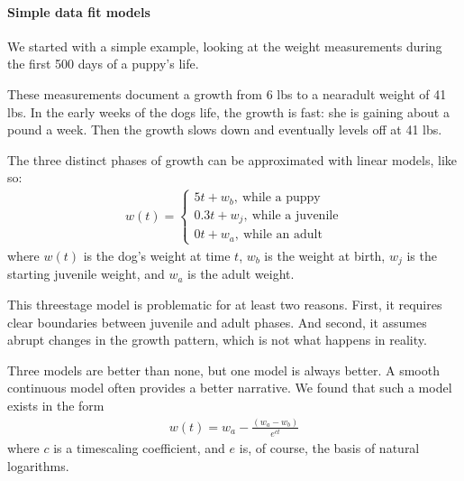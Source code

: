 \documentclass[letterpaper,10pt,english]{sphinxmanual}
\let\sphinxpxdimen\pdfpxdimen\else\newdimen\sphinxpxdimen
\begin{document}
\paragraph{Simple data fit models}
\label{\detokenize{COMP180/2020Spring/week2:simple-data-fit-models}}
\noindent{\hspace*{\fill}\sphinxincludegraphics[width=270.00000\sphinxpxdimen,height=180.00000\sphinxpxdimen]{{puppyGrowth}.png}}

We started with a simple example, looking at the weight measurements during the first 500 days of a puppy’s life.

These measurements document a growth from 6 lbs to a near\sphinxhyphen{}adult weight of 41 lbs. In the early weeks of the dogs life, the growth is fast: she is gaining about a pound a week. Then the growth slows down and eventually levels off at 41 lbs.

The three distinct phases of growth can be approximated with linear models, like so:
\begin{equation*}
\begin{split}w(t) = \left\{ \begin{array}{l} 5t+w_b,\ \text{while a puppy}\\0.3t+w_j,\ \text{while a juvenile}\\0t+w_a,\ \text{while an adult}\end{array} \right.\end{split}
\end{equation*}
where \(w(t)\) is the dog’s weight at time \(t\), \(w_b\) is the weight at birth, \(w_j\) is the starting juvenile weight, and \(w_a\) is the adult weight.

This three\sphinxhyphen{}stage model is problematic for at least two reasons. First, it requires clear boundaries between juvenile and adult phases. And second, it assumes abrupt changes in the growth pattern, which is not what happens in reality.

Three models are better than none, but one model is always better. A smooth continuous model often provides a better narrative. We found that such a model exists in the form
\begin{equation*}
\begin{split}w(t) = w_a - \frac{(w_a-w_b)}{e^{ct}}\end{split}
\end{equation*}
where \(c\) is a time\sphinxhyphen{}scaling coefficient, and \(e\) is, of course, the basis of natural logarithms.
\end{document}
